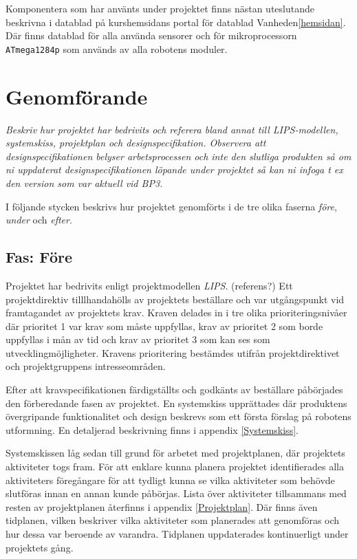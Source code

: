 \documentclass[11pt]{article}
\begin{document}
\begin{flushleft}
Komponentera som har använts under projektet finns nästan uteslutande beskrivna i datablad på kurshemsidans portal för datablad Vanheden\ref{hemsidan}. Där finns datablad för alla använda sensorer och för mikroprocessorn \verb+ATmega1284p+ som används av alla robotens moduler.

\pagebreak

\section{Genomförande}
\textit{Beskriv hur projektet har bedrivits och referera bland annat till LIPS-modellen, systemskiss, projektplan och designspecifikation. Observera att designspecifikationen belyser arbetsprocessen och inte den slutliga produkten så om ni uppdaterat designspecifikationen löpande under projektet så kan ni infoga t ex den version som var aktuell vid BP3.}

I följande stycken beskrivs hur projektet genomförts i de tre olika faserna \textit{före}, \textit{under} och \textit{efter}.

\subsection{Fas: Före}
Projektet har bedrivits enligt projektmodellen \textit{LIPS}. (referens?) Ett projektdirektiv tilllhandahölls av projektets beställare och var utgångspunkt vid framtagandet av projektets krav. Kraven delades in i tre olika prioriteringsnivåer där prioritet 1 var krav som måste uppfyllas, krav av prioritet 2 som borde uppfyllas i mån av tid och krav av prioritet 3 som kan ses som utvecklingmöjligheter. Kravens prioritering bestämdes utifrån projektdirektivet och projektgruppens intresseområden. 

Efter att kravspecifikationen färdigställts och godkänts av beställare påbörjades den förberedande fasen av projektet. En systemskiss upprättades där produktens övergripande funktionalitet och design beskrevs som ett första förslag på robotens utformning. En detaljerad beskrivning finns i appendix \ref{Systemskiss}. 

Systemskissen låg sedan till grund för arbetet med projektplanen, där projektets aktiviteter togs fram. För att enklare kunna planera projektet identifierades alla aktiviteters föregångare för att tydligt kunna se vilka aktiviteter som behövde slutföras innan en annan kunde påbörjas. Lista över aktiviteter tillsammans med resten av projektplanen återfinns i appendix \ref{Projektplan}. Där finns även tidplanen, vilken beskriver vilka aktiviteter som planerades att genomföras och hur dessa var beroende av varandra. Tidplanen uppdaterades kontinuerligt under projektets gång.


\end{flushleft}
\end{document}
